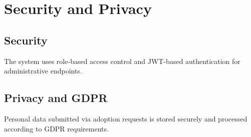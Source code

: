 \section{Security and Privacy}

\subsection{Security}
The system uses role-based access control and JWT-based authentication
for administrative endpoints.

\subsection{Privacy and GDPR}
Personal data submitted via adoption requests is stored securely
and processed according to GDPR requirements.
